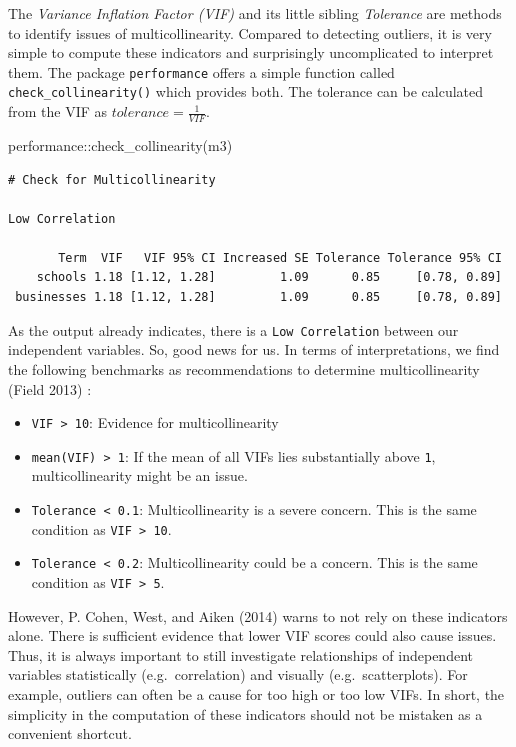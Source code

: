 \documentclass[
  letterpaper,
]{krantz}
\makeatletter
\newenvironment{Shaded}{\begin{snugshade}}{\end{snugshade}}
\newcommand{\FunctionTok}[1]{\textcolor[rgb]{0.28,0.35,0.67}{#1}}
\newcommand{\NormalTok}[1]{\textcolor[rgb]{0.00,0.23,0.31}{#1}}
\newcommand{\SpecialCharTok}[1]{\textcolor[rgb]{0.37,0.37,0.37}{#1}}
\newenvironment{kframe}{%
\medskip{}
\setlength{\fboxsep}{.8em}
 \def\at@end@of@kframe{}%
 \ifinner\ifhmode%
  \def\at@end@of@kframe{\end{minipage}}%
  \begin{minipage}{\columnwidth}%
 \fi\fi%
 \def\FrameCommand##1{\hskip\@totalleftmargin \hskip-\fboxsep
 \colorbox{shadecolor}{##1}\hskip-\fboxsep
     \hskip-\linewidth \hskip-\@totalleftmargin \hskip\columnwidth}%
 \MakeFramed {\advance\hsize-\width
   \@totalleftmargin\z@ \linewidth\hsize
   \@setminipage}}%
 {\par\unskip\endMakeFramed%
 \at@end@of@kframe}
\renewenvironment{Shaded}{\begin{kframe}}{\end{kframe}}
\makeatother
\begin{document}
The \emph{Variance Inflation Factor (VIF)} and its little sibling
\emph{Tolerance} are methods to identify issues of multicollinearity.
Compared to detecting outliers, it is very simple to compute these
indicators and surprisingly uncomplicated to interpret them. The package
\texttt{performance} offers a simple function called
\texttt{check\_collinearity()} which provides both. The tolerance can be
calculated from the VIF as \(tolerance = \frac{1}{VIF}\).

\begin{Shaded}
\begin{Highlighting}[]
\NormalTok{performance}\SpecialCharTok{::}\FunctionTok{check\_collinearity}\NormalTok{(m3)}
\end{Highlighting}
\end{Shaded}

\begin{verbatim}
# Check for Multicollinearity

Low Correlation

       Term  VIF   VIF 95% CI Increased SE Tolerance Tolerance 95% CI
    schools 1.18 [1.12, 1.28]         1.09      0.85     [0.78, 0.89]
 businesses 1.18 [1.12, 1.28]         1.09      0.85     [0.78, 0.89]
\end{verbatim}

As the output already indicates, there is a \texttt{Low\ Correlation}
between our independent variables. So, good news for us. In terms of
interpretations, we find the following benchmarks as recommendations to
determine multicollinearity (Field 2013) :

\begin{itemize}
\item
  \texttt{VIF\ \textgreater{}\ 10}: Evidence for multicollinearity
\item
  \texttt{mean(VIF)\ \textgreater{}\ 1}: If the mean of all VIFs lies
  substantially above \texttt{1}, multicollinearity might be an issue.
\item
  \texttt{Tolerance\ \textless{}\ 0.1}: Multicollinearity is a severe
  concern. This is the same condition as
  \texttt{VIF\ \textgreater{}\ 10}.
\item
  \texttt{Tolerance\ \textless{}\ 0.2}: Multicollinearity could be a
  concern. This is the same condition as
  \texttt{VIF\ \textgreater{}\ 5}.
\end{itemize}

However, P. Cohen, West, and Aiken (2014) warns to not rely on these
indicators alone. There is sufficient evidence that lower VIF scores
could also cause issues. Thus, it is always important to still
investigate relationships of independent variables statistically
(e.g.~correlation) and visually (e.g.~scatterplots). For example,
outliers can often be a cause for too high or too low VIFs. In short,
the simplicity in the computation of these indicators should not be
mistaken as a convenient shortcut.
\end{document}
